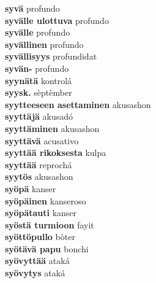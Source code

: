 \textbf{ syvä  } profundo \\
\textbf{ syvälle ulottuva  } profundo \\
\textbf{ syvälle  } profundo \\
\textbf{ syvällinen  } profundo \\
\textbf{ syvällisyys  } profundidat \\
\textbf{ syvän-  } profundo \\
\textbf{ syynätä  } kontrolá \\
\textbf{ syysk.  } sèptèmber \\
\textbf{ syytteeseen asettaminen  } akusashon \\
\textbf{ syyttäjä  } akusadó \\
\textbf{ syyttäminen  } akusashon \\
\textbf{ syyttävä  } acusativo \\
\textbf{ syyttää rikoksesta  } kulpa \\
\textbf{ syyttää  } reprochá \\
\textbf{ syytös  } akusashon \\
\textbf{ syöpä  } kanser \\
\textbf{ syöpäinen  } kanseroso \\
\textbf{ syöpätauti  } kanser \\
\textbf{ syöstä turmioon  } fayit \\
\textbf{ syöttöpullo  } bòter \\
\textbf{ syötävä papu  } bonchi \\
\textbf{ syövyttää  } ataká \\
\textbf{ syövytys  } ataká \\
